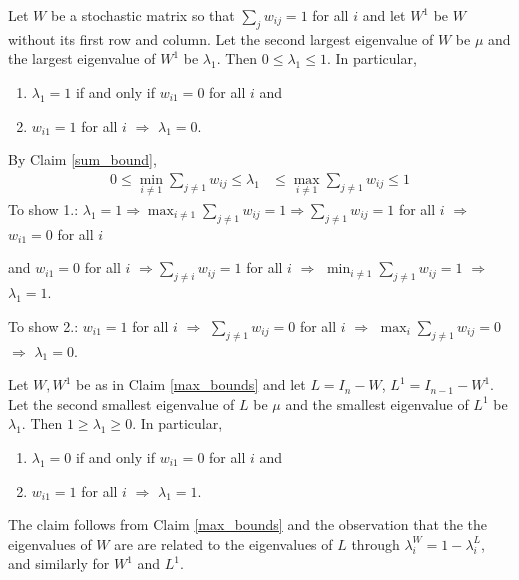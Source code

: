 \documentclass{article}
\begin{document}
\begin{claim} \label{max_bounds}
Let $W$ be a stochastic matrix so that $\sum_jw_{ij}=1$ for all $i$ and let $W^1$ be $W$ without its first row and column.  Let the second largest eigenvalue of $W$ be $\mu$ and the largest eigenvalue of $W^1$ be $\lambda_1$.  Then $0\leq \lambda_1\leq 1$.  In particular,
\begin{enumerate}
\item $\lambda_1=1$ if and only if $w_{i1}=0$ for all $i$ and
\item $w_{i1}=1$ for all $i$ $\Rightarrow$ $\lambda_1=0$.
\end{enumerate}
\end{claim}

\begin{pf}
By Claim \ref{sum_bound}, 
\begin{align*}
0\leq \min_{i\neq 1}\sum_{j\neq 1} w_{ij}\leq \lambda_1&\leq \max_{i\neq 1}\sum_{j\neq 1}w_{ij}\leq 1
\end{align*}
To show 1.: $\lambda_1=1 \Rightarrow \max_{i\neq 1}\sum_{j\neq 1}w_{ij}=1 \Rightarrow \sum_{j\neq 1}w_{ij}=1$ for all $i$ $\Rightarrow$ $w_{i1}=0$ for all $i$

and $w_{i1}=0$ for all $i$ $\Rightarrow \sum_{j\neq i}w_{ij}=1$ for all $i$ $\Rightarrow$ $\min_{i\neq 1}\sum_{j\neq 1}w_{ij}=1$ $\Rightarrow$ $\lambda_1=1$.

To show 2.: $w_{i1}=1$ for all $i$ $\Rightarrow$ $\sum_{j\neq 1}w_{ij}=0$ for all $i$ $\Rightarrow $ $\max_i\sum_{j\neq 1}w_{ij}=0$ $\Rightarrow $ $\lambda_1=0$.
\end{pf}

\begin{claim} \label{myconjecture}
Let $W,W^1$ be as in Claim \ref{max_bounds} and let $L=I_n-W$, $L^1=I_{n-1}-W^1$.  Let the second smallest eigenvalue of $L$ be $\mu$ and the smallest eigenvalue of $L^1$ be $\lambda_1$.  Then $1\geq \lambda_1\geq 0$.  In particular,
\begin{enumerate}
\item $\lambda_1=0$ if and only if $w_{i1}=0$ for all $i$ and
\item $w_{i1}=1$ for all $i$ $\Rightarrow$ $\lambda_1=1$.
\end{enumerate}
\end{claim}

\begin{pf}
The claim follows from Claim \ref{max_bounds} and the observation that the the eigenvalues of $W$ are are related to the eigenvalues of $L$ through $\lambda^W_i=1-\lambda^L_i$, and similarly for $W^1$ and $L^1$.
\end{pf}
\end{document}

